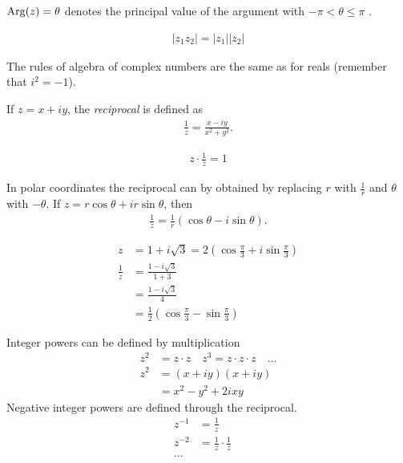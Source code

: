 $\operatorname{Arg}(z) = \theta$ denotes the principal value of the argument with $-\pi < \theta \le \pi$	.

\begin{rk}
	\begin{align*}
	|z_1 z_2| = |z_1| |z_2|
	\end{align*}
\end{rk}
The rules of algebra of complex numbers are the same as for reals (remember that $i^2 = -1$).

\begin{df}
	If $z = x + iy$, the \emph{reciprocal} is defined as 
	\begin{align*}
	\frac 1 z = \frac{x-iy}{x^2+y^2}.
	\end{align*}
\end{df}

\begin{rk}
	\begin{align*}
	\displaystyle z \cdot \frac 1 z = 1
	\end{align*}
\end{rk}

In polar coordinates the reciprocal can by obtained by replacing $r$ with $\frac 1 r$ and $\theta$ with $-\theta$. If $z = r \cos \theta + i  r \sin \theta$, then 
\begin{align*}
\frac 1 z = \frac 1 r ( \cos \theta - i \sin \theta).
\end{align*} 

\begin{ex}
	\begin{align*}
	z & = 1 + i \sqrt 3 = 2 \left( \cos \frac \pi 3 + i \sin \frac \pi 3 \right) \\
	\frac 1 z & = \frac{1-i \sqrt 3}{1+3} \\
	& =  \frac{1-i \sqrt 3}{4} \\
	& = \frac 1 2 \left( \cos \frac \pi 3  - \sin \frac \pi 3 \right)
	\end{align*}
\end{ex}

Integer powers can be defined by multiplication
\begin{align*}
z^2 & = z \cdot z \quad z^3 = z \cdot z \cdot z \quad \dots \\
z^2 & = (x+iy)(x+iy) \\
& = x^2 - y^2 + 2ixy
\end{align*}
Negative integer powers are defined through the reciprocal.
\begin{align*}
z^{-1} & = \frac 1 z \\
z^{-2} & = \frac 1 z \cdot \frac 1 z \quad \\
\dots &
\end{align*}


